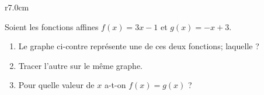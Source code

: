 
\begin{exercice}\label{exosmath-0569}

\begin{wrapfigure}{r}{7.0cm}
   \vspace{-1cm}        %
   \centering
   
\end{wrapfigure}

    Soient les fonctions affines \( f(x)=3x-1\) et \( g(x)=-x+3\). 
    \begin{enumerate}
        \item
            Le graphe ci-contre représente une de ces deux fonctions; laquelle ?
        \item
            Tracer l'autre sur le même graphe.
        \item
            Pour quelle valeur de \( x\) a-t-on \( f(x)=g(x)\) ? 
    \end{enumerate}

\end{exercice}
